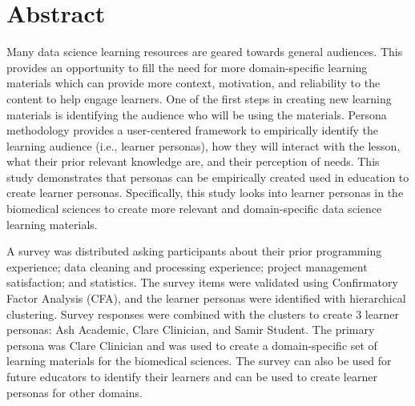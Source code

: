 \documentclass[../main.tex]{subfiles}
\begin{document}
\section*{Abstract}



    Many data science learning resources are geared towards general audiences.
    This provides an opportunity to fill the need for more domain-specific learning materials
    which can provide more context, motivation, and reliability to the content to help engage learners.
    One of the first steps in creating new learning materials is identifying the audience who will
    be using the materials.
    Persona methodology provides a user-centered framework to empirically identify
    the learning audience (i.e., learner personas), how they will interact with the lesson,
    what their prior relevant knowledge are,
    and their perception of needs.
    This study demonstrates that personas can be empirically created used in education to create learner personas.
    Specifically, this study looks into learner personas in the biomedical sciences to
    create more relevant and domain-specific data science learning materials.

    A survey was distributed asking participants about their
    prior programming experience;
    data cleaning and processing experience;
    project management satisfaction; and
    statistics.
    The survey items were validated using Confirmatory Factor Analysis (CFA),
    and the learner personas were identified with hierarchical clustering.
    Survey responses were combined with the clusters to create 3 learner personas:
    Ash Academic, Clare Clinician, and Samir Student.
    The primary persona was Clare Clinician and was used to create a domain-specific
    set of learning materials for the biomedical sciences.
    The survey can also be used for future educators to identify their learners
    and can be used to create learner personas for other domains.
\end{document}
